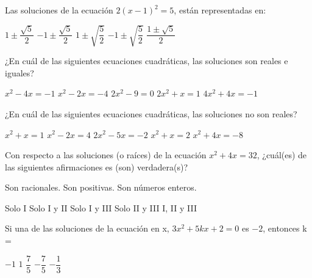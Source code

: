 \documentclass[sin nombre]{srs}
\begin{document}
\separador
\begin{preguntas}[after-item-skip=2cm]
\pregunta Las soluciones de la ecuación $2\left(x - 1\right)^{2} = 5$, están representadas en:
\begin{vertical}
\alternativa $1 \pm \dfrac{\sqrt{5}}{2}$
\alternativa $-1 \pm \dfrac{\sqrt{5}}{2}$
\alternativa $1 \pm \sqrt{\dfrac{5}{2}}$
\alternativa $-1 \pm \sqrt{\dfrac{5}{2}}$
\alternativa $\dfrac{1 \pm \sqrt{5}}{2}$
\end{vertical}

\pregunta ¿En cuál de las siguientes ecuaciones cuadráticas, las soluciones son reales e iguales?
\begin{vertical}
\alternativa $x^{2} - 4x = -1$
\alternativa $x^{2} - 2x = -4$
\alternativa $2x^{2}-9=0$
\alternativa $2x^{2} + x = 1$
\alternativa $4x^{2} + 4x =-1$
\end{vertical}

\pregunta ¿En cuál de las siguientes ecuaciones cuadráticas, las soluciones no son reales?
\begin{vertical}
\alternativa $x^{2} + x = 1$
\alternativa $x^{2} - 2x = 4$
\alternativa $2x^{2} - 5x = -2$
\alternativa $x^{2} + x = 2$
\alternativa $x^{2} + 4x = -8$
\end{vertical}

\pregunta Con respecto a las soluciones (o raíces) de la ecuación $x^{2} + 4x = 32$, ¿cuál(es) de las siguientes afirmaciones es (son) verdadera(s)?
\begin{verticali}
\alternativa Son racionales.
\alternativa Son positivas.
\alternativa Son números enteros.
\end{verticali}
\begin{vertical}
\alternativa Solo I
\alternativa Solo I y II
\alternativa Solo I y III
\alternativa Solo II y III
\alternativa I, II y III
\end{vertical}

\pregunta Si una de las soluciones de la ecuación en x, $3x^{2} + 5kx + 2 = 0$ es $-2$, entonces k =
\begin{vertical}
\alternativa $-1$
\alternativa $1$
\alternativa $\dfrac{7}{5}$
\alternativa $-\dfrac{7}{5}$
\alternativa $-\dfrac{1}{3}$
\end{vertical}



\end{preguntas}
\end{document}

